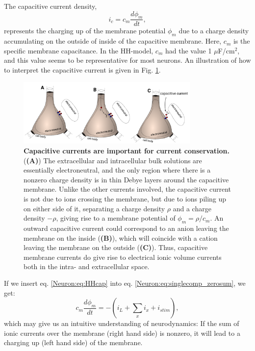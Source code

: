 The capacitive current density,
\begin{equation}
i_c = c_m \frac{d\phi_m}{dt},
\label{Neuron:eq:HHcap}
\end{equation}
represents the charging up of the membrane potential $\phi_m$ due to a charge density accumulating on the outside of inside of the capacitive membrane. Here, $c_m$ is the specific membrane capacitance. In the HH-model, $c_m$ had the value
1 $\mu$F/cm$^2$, and this value seems to be representative for most neurons.  An illustration of how to interpret the capacitive current is given in Fig. \ref{Neuron:fig:capacitive_currents}. 

\begin{figure}[!ht]
\begin{center}
\includegraphics[width=0.8\textwidth]{Figures/Neuron/capacitive_currents.pdf}
\end{center}
\caption{\textbf{Capacitive currents are important for current conservation.}  (\textbf{(A)}) The extracellular and intracellular bulk solutions are essentially electroneutral, and the only region where there is a nonzero charge density is in thin Debye layers around the capacitive membrane. Unlike the other currents involved, the capacitive current is not due to ions crossing the membrane, but due to ions piling up on either side of it, separating a charge density $\rho$ and a charge density $-\rho$, giving rise to a membrane potential of $\phi_m = \rho/c_m$. An outward capacitive current could correspond to an anion leaving the membrane on the inside (\textbf{(B)}), which will coincide with a cation leaving the membrane on the outside (\textbf{(C)}). Thus, capacitive membrane currents do give rise to electrical ionic volume currents both in the intra- and extracellular space.
}
\label{Neuron:fig:capacitive_currents}
\end{figure}

If we insert eq. \ref{Neuron:eq:HHcap} into eq. \ref{Neuron:eq:singlecomp_zerosum}, we get:
\begin{equation}
c_m \frac{d\phi_m}{dt} = - (i_L + \sum_x{i_x} +  i_{stim}),
\label{Neuron:eq:singlecomp_capinserted}
\end{equation}
which may give us an intuitive understanding of neurodynamics: If the sum of ionic currents over the membrane (right hand side) is nonzero, it will lead to a charging up (left hand side) of the membrane. 


